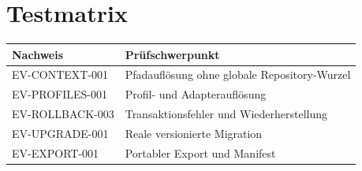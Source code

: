 \section{Testmatrix}
\label{app:test-matrix}

\begin{tabularx}{\textwidth}{@{}lX@{}}
\toprule
Nachweis & Prüfschwerpunkt \\
\midrule
EV-CONTEXT-001 & Pfadauflösung ohne globale Repository-Wurzel \\
EV-PROFILES-001 & Profil- und Adapterauflösung \\
EV-ROLLBACK-003 & Transaktionsfehler und Wiederherstellung \\
EV-UPGRADE-001 & Reale versionierte Migration \\
EV-EXPORT-001 & Portabler Export und Manifest \\
\bottomrule
\end{tabularx}
